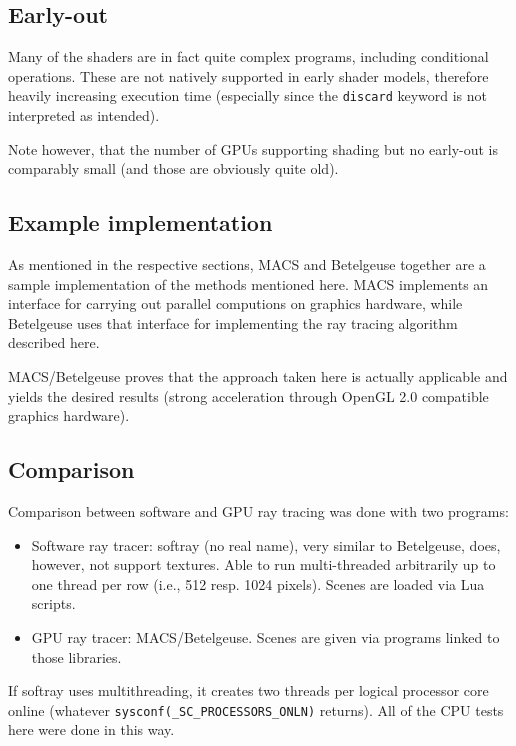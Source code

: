 \documentclass[english,fleqn,10pt,twocolumn]{article}
\begin{document}
\subsection{Early-out}

Many of the shaders are in fact quite complex programs, including conditional operations. These are not natively supported in early shader models, therefore heavily increasing execution time (especially since the {\tt discard} keyword
is not interpreted as intended).

Note however, that the number of GPUs supporting shading but no early-out is comparably small (and those are obviously quite old).

\subsection{Example implementation}

As mentioned in the respective sections, MACS and Betelgeuse together are a sample implementation of the methods mentioned here. MACS implements an interface for carrying out parallel computions on graphics hardware, while Betelgeuse
uses that interface for implementing the ray tracing algorithm described here.

MACS/Betelgeuse proves that the approach taken here is actually applicable and yields the desired results (strong acceleration through OpenGL 2.0 compatible graphics hardware).

\subsection{Comparison}

Comparison between software and GPU ray tracing was done with two programs:
\begin{itemize}
    \item Software ray tracer: softray (no real name), very similar to Betelgeuse, does, however, not support textures. Able to run multi-threaded arbitrarily up to one thread per row (i.e., 512 resp. 1024 pixels). Scenes are loaded via
        Lua scripts.
    \item GPU ray tracer: MACS/Betelgeuse. Scenes are given via programs linked to those libraries.
\end{itemize}

If softray uses multithreading, it creates two threads per logical processor core online (whatever {\tt sysconf(\_SC\_PROCESSORS\_ONLN)} returns). All of the CPU tests here were done in this way.
\end{document}
